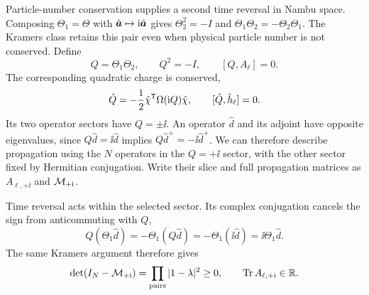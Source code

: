 Particle-number conservation supplies a second time reversal in Nambu space. Composing $\Theta_1=\Theta$ with $\hat{\bm{a}}\mapsto\mathrm{i}\hat{\bm{a}}$ gives $\Theta_2^2=-I$ and $\Theta_1\Theta_2=-\Theta_2\Theta_1$. The Kramers class retains this pair even when physical particle number is not conserved. Define
\begin{equation}
    Q=\Theta_1\Theta_2,\qquad Q^2=-I,\qquad [Q,A_\ell]=0.
    \label{eq:trs_Q_properties}
\end{equation}
The corresponding quadratic charge is conserved,
\begin{equation}
    \hat Q=-\frac12\hat\chi^{\mathsf{T}}\Omega(\mathrm{i} Q)\hat\chi,
    \qquad [\hat Q,\hat h_\ell]=0.
    \label{eq:trs_charge_conservation}
\end{equation}
Its two operator sectors have $Q=\pm\ii$. An operator $\hat d$ and its adjoint have opposite eigenvalues, since $Q\hat d=\ii\hat d$ implies $Q\hat d^+=-\ii\hat d^+$. We can therefore describe propagation using the $N$ operators in the $Q=+\ii$ sector, with the other sector fixed by Hermitian conjugation. Write their slice and full propagation matrices as $A_{\ell,+\ii}$ and $\mathcal{M}_{+\mathrm{i}}$.

Time reversal acts within the selected sector. Its complex conjugation cancels the sign from anticommuting with $Q$,
\begin{equation}
    Q(\Theta_1\hat d)=-\Theta_1(Q\hat d)
    =-\Theta_1(\ii\hat d)=\ii\Theta_1\hat d.
    \label{eq:trs_Kramers_in_reduced_space}
\end{equation}
The same Kramers argument therefore gives
\begin{equation}
    \det(I_N-\mathcal{M}_{+\mathrm{i}})=\prod_{\rm pairs}|1-\lambda|^2\ge0,
    \qquad \operatorname{Tr} A_{\ell,+\mathrm{i}}\in\mathbb R.
    \label{eq:trs_Kramers_determinant}
\end{equation}

